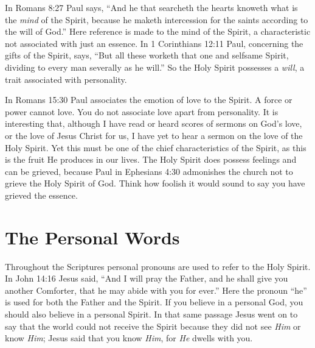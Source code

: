In Romans 8:27 Paul says, “And he that searcheth the
hearts knoweth what is the \emph{mind} of the Spirit, because he
maketh intercession for the saints according to the will of
God.” Here reference is made to the mind of the Spirit, a
characteristic not associated with just an essence. In 1 Corinthians
12:11 Paul, concerning the gifts of the Spirit, says,
“But all these worketh that one and selfsame Spirit, dividing
to every man severally as he will.” So the Holy Spirit
possesses a \emph{will}, a trait associated with personality.

In Romans 15:30 Paul associates the emotion of love
to the Spirit. A force or power cannot love. You do not
associate love apart from personality. It is interesting that,
although I have read or heard scores of sermons on God’s
love, or the love of Jesus Christ for us, I have yet to hear a
sermon on the love of the Holy Spirit. Yet this must be one
of the chief characteristics of the Spirit, as this is the fruit He
produces in our lives. The Holy Spirit does possess feelings
and can be grieved, because Paul in Ephesians 4:30 admonishes
the church not to grieve the Holy Spirit of God. Think
how foolish it would sound to say you have grieved the
essence.


\section*{The Personal Words}

Throughout the Scriptures personal pronouns are used
to refer to the Holy Spirit. In John 14:16 Jesus said, “And
I will pray the Father, and he shall give you another Comforter,
that he may abide with you for ever.” Here the pronoun
“he” is used for both the Father and the Spirit. If you
believe in a personal God, you should also believe in a personal
Spirit. In that same passage Jesus went on to say that
the world could not receive the Spirit because they did not
see \emph{Him} or know \emph{Him}; Jesus said that you know \emph{Him},
 for \emph{He} dwells with you.

